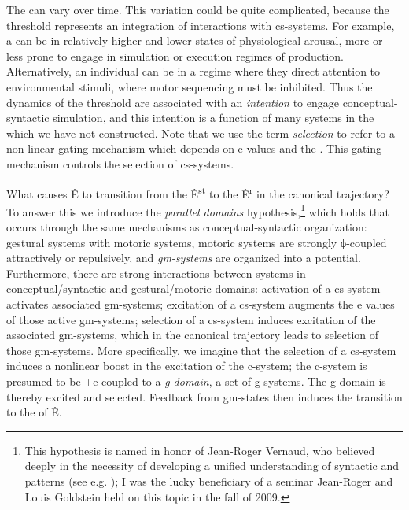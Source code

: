   The  can vary over time. This variation could be quite complicated, because the threshold represents an integration of  interactions with cs-systems. For example, a  can be in relatively higher and lower states of physiological arousal, more or less prone to engage in simulation or execution regimes of production. Alternatively, an individual can be in a regime where they direct attention to environmental stimuli, where motor sequencing must be inhibited. Thus the dynamics of the threshold are associated with an \textit{intention} to engage conceptual-syntactic simulation, and this intention is a function of many systems in the  which we have not constructed. Note that we use the term \textit{selection} to refer to a non-linear gating mechanism which depends on e values and the . This gating mechanism controls the selection of cs-systems.

  What causes Ê to transition from the  Ê\textsuperscript{st} to the  Ê\textsuperscript{r} in the canonical trajectory? To answer this we introduce the \textit{parallel domains} hypothesis,\footnote{This hypothesis is named in honor of Jean-Roger Vernaud, who believed deeply in the necessity of developing a unified understanding of syntactic and  patterns (see e.g. \citealt{FreidinVergnaud2001,Vergnaud1977}); I was the lucky beneficiary of a seminar Jean-Roger and Louis Goldstein held on this topic in the fall of 2009.} which holds that  occurs through the same mechanisms as conceptual-syntactic organization: gestural systems  with motoric systems, motoric systems are strongly ϕ-coupled attractively or repulsively, and \textit{gm-systems} are organized into a  potential. Furthermore, there are strong interactions between systems in conceptual/syntactic and gestural/motoric domains: activation of a cs-system activates associated gm-systems; excitation of a cs-system augments the e values of those active gm-systems; selection of a cs-system induces excitation of the associated gm-systems, which in the canonical trajectory leads to selection of those gm-systems. More specifically, we imagine that the selection of a cs-system induces a nonlinear boost in the excitation of the c-system; the c-system is presumed to be +e-coupled to a \textit{g-domain}, a set of g-systems. The g-domain is thereby excited and selected. Feedback from gm-states then induces the transition to the  of  Ê.


